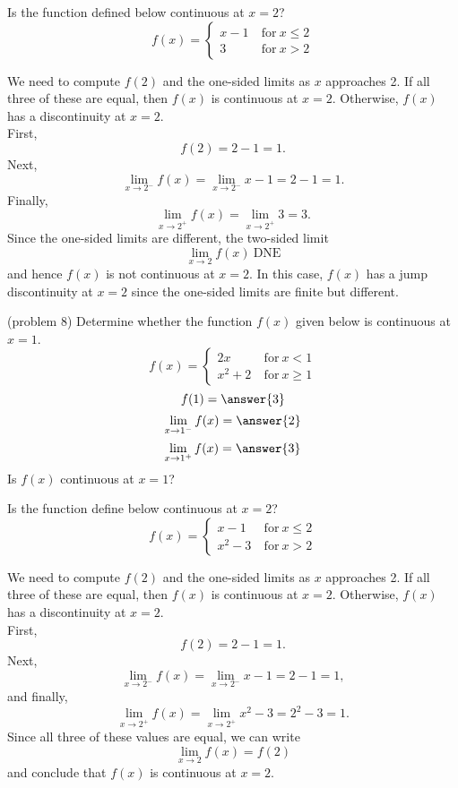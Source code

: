 \documentclass[handout]{ximera}
\begin{document}
\begin{example}[example 8]
Is the function defined below continuous at $x = 2$?
\[
f(x) = \left\{
     \begin{array}{lr}
       x-1 & \ \text{for} \  x \leq 2 \\
       3 & \ \text{for} \ x > 2
     \end{array}
   \right.
\]


We need to  compute $f(2)$ and the one-sided limits as $x$ approaches 2.
If all three of these are equal, then $f(x)$ is continuous at $x=2$.
Otherwise, $f(x)$ has a discontinuity at $x=2$.\\
First, 
\[
f(2) = 2-1 = 1.
\]
Next,  
\[\lim_{x \to 2^-} f(x) = \lim_{x \to 2^-} x-1 = 2-1 = 1.\]
Finally,
\[\lim_{x \to 2^+} f(x) = \lim_{x \to 2^+}3 = 3.\]
Since the one-sided limits are different, the two-sided limit
\[
\lim_{x \to 2} f(x) \ \text{DNE}
\]
and hence $f(x)$ is not continuous at $x = 2$.
In this case, $f(x)$ has a jump discontinuity at $x=2$ since the one-sided limits are finite but different.
\end{example}

\begin{problem}(problem 8)
Determine whether the function $f(x)$ given below is continuous at $x = 1$.
\[
f(x) = \left\{
     \begin{array}{lr}
       2x & \ \text{for} \  x < 1 \\
       x^2 + 2 & \ \text{for} \ x \geq 1
     \end{array}
   \right.
\]
\[
f(1) = \answer{3}
\]
\[
\lim_{x \to 1^-} f(x) = \answer{2}
\]
\[
\lim_{x \to 1^+} f(x) = \answer{3}
\]
Is $f(x)$ continuous at $x = 1$?
\begin{multipleChoice}
\end{multipleChoice}
\end{problem}





\begin{example}[example 9]
Is the function define below continuous at $x = 2$?
\[f(x) = \left\{
     \begin{array}{lr}
       x-1 & \ \text{for} \  x \leq 2 \\
       x^2 - 3 & \ \text{for} \ x > 2
     \end{array}
   \right.
\]

We need to  compute $f(2)$ and the one-sided limits as $x$ approaches 2.
If all three of these are equal, then $f(x)$ is continuous at $x=2$.
Otherwise, $f(x)$ has a discontinuity at $x=2$.\\
First, 
\[
f(2) = 2-1 = 1.
\]
Next, 
\[
\lim_{x \to 2^-} f(x) = \lim_{x \to 2^-} x-1 = 2-1 = 1,
\]
and finally,
\[
\lim_{x \to 2^+} f(x) = \lim_{x \to 2^+} x^2 - 3 = 2^2 - 3 = 1.
\]
Since all three of these values are equal, we can write
\[
\lim_{x \to 2} f(x) = f(2)
\]
and conclude that $f(x)$ is continuous at $x = 2$.
\end{example}
\end{document}
